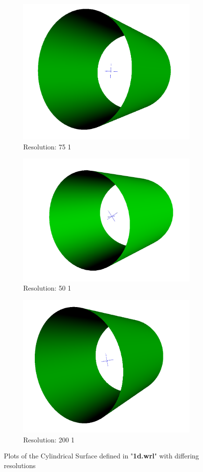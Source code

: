 \documentclass[acmlarge,nonacm=true]{acmart}
\begin{document}
\begin{figure}[H]
	\begin{subfigure}{.33\textwidth}
	  \centering
	  \includegraphics[width=.8\linewidth]{fig/1d75_1}
	  \caption{Resolution: 75 1}
	\end{subfigure}%
	\begin{subfigure}{.33\textwidth}
	  \centering
	  \includegraphics[width=.8\linewidth]{fig/1d50_1}
	  \caption{Resolution: 50 1}
	\end{subfigure}
	\begin{subfigure}{.33\textwidth}
		\centering
		\includegraphics[width=.8\linewidth]{fig/1d200_1}
		\caption{Resolution: 200 1}
	  \end{subfigure}
	\caption{Plots of the Cylindrical Surface defined in "\textbf{1d.wrl}" with differing resolutions}
	\label{fig:1d}
\end{figure}
\end{document}
